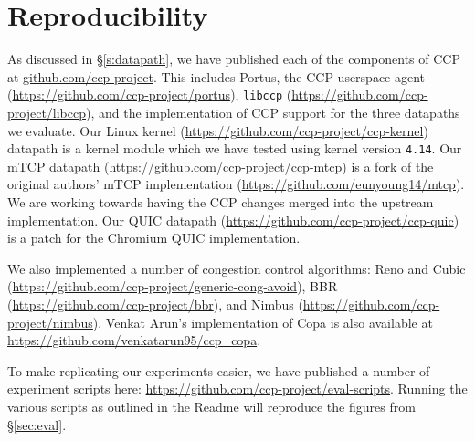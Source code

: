 \section{Reproducibility}
\label{sec:repro}

As discussed in \S\ref{s:datapath}, we have published each of the components of CCP at \url{github.com/ccp-project}. 
This includes Portus, the CCP userspace agent (\url{https://github.com/ccp-project/portus}), \texttt{libccp} (\url{https://github.com/ccp-project/libccp}), and the implementation of CCP support for the three datapaths we evaluate. 
Our Linux kernel (\url{https://github.com/ccp-project/ccp-kernel}) datapath is a kernel module which we have tested using kernel version \texttt{4.14}. 
Our mTCP datapath (\url{https://github.com/ccp-project/ccp-mtcp}) is a fork of the original authors' mTCP implementation (\url{https://github.com/eunyoung14/mtcp}). We are working towards having the CCP changes merged into the upstream implementation.
Our QUIC datapath (\url{https://github.com/ccp-project/ccp-quic}) is a patch for the Chromium QUIC implementation. 

We also implemented a number of congestion control algorithms: Reno and Cubic (\url{https://github.com/ccp-project/generic-cong-avoid}), BBR (\url{https://github.com/ccp-project/bbr}), and Nimbus (\url{https://github.com/ccp-project/nimbus}). Venkat Arun's implementation of Copa is also available at \url{https://github.com/venkatarun95/ccp_copa}.

To make replicating our experiments easier, we have published a number of experiment scripts here: \url{https://github.com/ccp-project/eval-scripts}. Running the various scripts as outlined in the Readme will reproduce the figures from \S\ref{sec:eval}.
